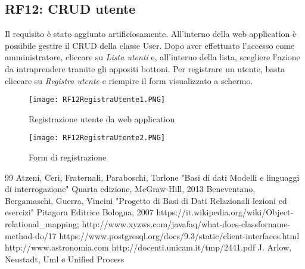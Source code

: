 \documentclass[12pt,a4paper,onecolumn,x11names]{article}
\begin{document}
	\subsection{RF12: CRUD utente}
		\begin{flushleft}
			Il requisito è stato aggiunto artificiosamente.\newline\newline
			All'interno della web application è possibile gestire il CRUD della classe User. Dopo aver effettuato l'accesso come amministratore, cliccare su \textit{Lista utenti} e, all'interno della lista, scegliere l'azione da intraprendere tramite gli appositi bottoni. Per registrare un utente, basta cliccare su \textit{Registra utente} e riempire il form visualizzato a schermo.
		\end{flushleft}
		\begin{figure}[!h]
			\centering
			\begin{minipage}[c]{.45\textwidth}
				\texttt{[image: RF12RegistraUtente1.PNG]}
				\caption{Registrazione utente da web application}
			\end{minipage}%
			\centering
			\begin{minipage}[c]{.45\textwidth}
				\texttt{[image: RF12RegistraUtente2.PNG]}
				\caption{Form di registrazione}
			\end{minipage}%
		\end{figure}
	
	\newpage
\renewcommand\refname{Bibliografia}
\begin{thebibliography} {99}
	 Atzeni, Ceri, Fraternali, Paraboschi, Torlone
	"Basi di dati Modelli e linguaggi di interrogazione"
	Quarta edizione, McGraw-Hill, 2013
	 Beneventano, Bergamaschi, Guerra, Vincini "Progetto di Basi di Dati Relazionali lezioni ed esercizi"
	Pitagora Editrice Bologna, 2007
	 https://it.wikipedia.org/wiki/Object-relational\_mapping;
	 http://www.xyzws.com/javafaq/what-does-classforname-method-do/17
	 https://www.postgresql.org/docs/9.3/static/client-interfaces.html
	http://www.astronomia.com
	http://docenti.unicam.it/tmp/2441.pdf
	 J. Arlow, Neustadt, Uml e Unified Process
\end{thebibliography}
\end{document}
